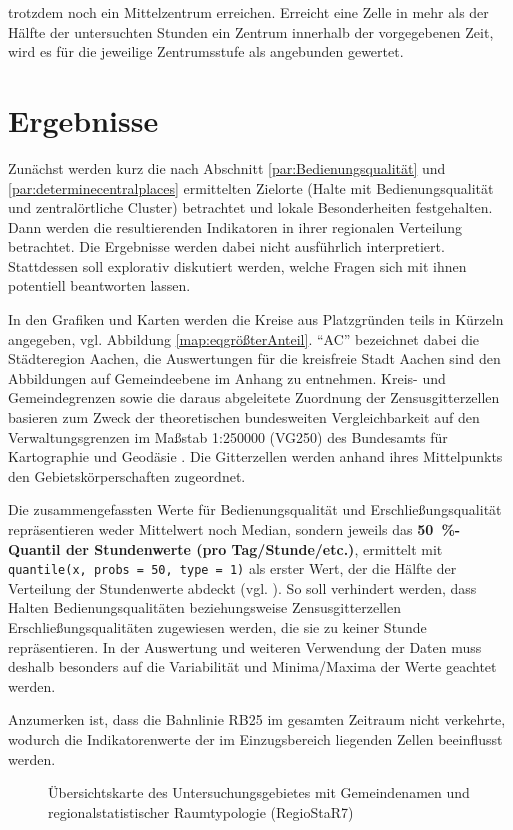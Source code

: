 \documentclass[11pt,pdftex,a4paper]{scrartcl}
\begin{document}
trotzdem noch ein Mittelzentrum erreichen. Erreicht eine Zelle in mehr als der Hälfte der untersuchten Stunden ein Zentrum innerhalb der vorgegebenen Zeit, wird es für die jeweilige Zentrumsstufe als angebunden gewertet.
	\FloatBarrier
	\pagebreak
\section{Ergebnisse}
\label{sec:Ergebnisse}
Zunächst werden kurz die nach Abschnitt \ref{par:Bedienungsqualität} und \ref{par:determinecentralplaces} ermittelten Zielorte (Halte mit Bedienungsqualität und zentralörtliche Cluster) betrachtet und lokale Besonderheiten festgehalten. Dann werden die resultierenden Indikatoren in ihrer regionalen Verteilung betrachtet. Die Ergebnisse werden dabei nicht ausführlich interpretiert. Stattdessen soll explorativ diskutiert werden, welche Fragen sich mit ihnen potentiell beantworten lassen.

In den Grafiken und Karten werden die Kreise aus Platzgründen teils in Kürzeln angegeben, vgl. Abbildung \ref{map:eqgrößterAnteil}. \enquote{AC} bezeichnet dabei die Städteregion Aachen, die Auswertungen für die kreisfreie Stadt Aachen sind den Abbildungen auf Gemeindeebene im Anhang zu entnehmen. Kreis- und Gemeindegrenzen sowie die daraus abgeleitete Zuordnung der Zensusgitterzellen basieren zum Zweck der theoretischen bundesweiten Vergleichbarkeit auf den Verwaltungsgrenzen im Maßstab 1:\num{250000} (VG250) des Bundesamts für Kartographie und Geodäsie \parencite{Verwaltungsgebiete1250}. Die Gitterzellen werden anhand ihres Mittelpunkts den Gebietskörperschaften zugeordnet.

Die zusammengefassten Werte für Bedienungsqualität und Erschließungsqualität repräsentieren weder Mittelwert noch Median, sondern jeweils das \textbf{\SI{50}{\percent}-Quantil der Stundenwerte (pro Tag/Stunde/etc.)}, ermittelt mit \texttt{quantile(x, probs = 50, type = 1)} als erster Wert, der die Hälfte der Verteilung der Stundenwerte abdeckt (vgl. \textcites{rstatsQuantile}{hyndmanSampleQuantilesStatistical1996}). So soll verhindert werden, dass Halten Bedienungsqualitäten beziehungsweise Zensusgitterzellen Erschließungsqualitäten zugewiesen werden, die sie zu keiner Stunde repräsentieren. In der Auswertung und weiteren Verwendung der Daten muss deshalb besonders auf die Variabilität und Minima/Maxima der Werte geachtet werden.

Anzumerken ist, dass die Bahnlinie RB25 im gesamten Zeitraum nicht verkehrte, wodurch die Indikatorenwerte der im Einzugsbereich liegenden Zellen beeinflusst werden.
\begin{figure}[!htbp]
	
	\label{map:gemübersicht}
	\caption{Übersichtskarte des Untersuchungsgebietes mit Gemeindenamen und regionalstatistischer Raumtypologie (RegioStaR7)}
\end{figure}
\end{document}
